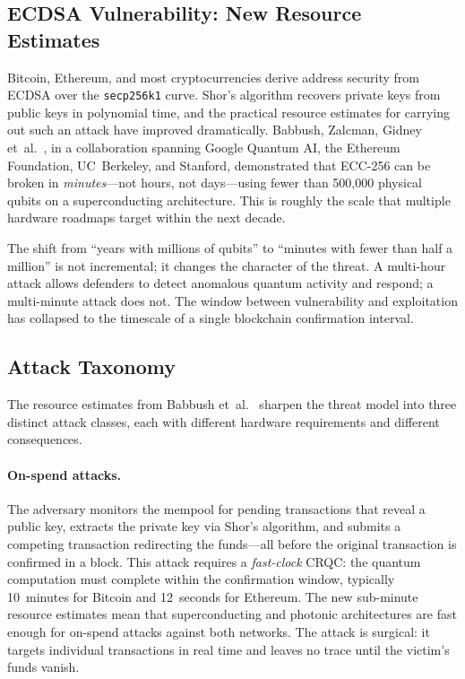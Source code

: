 \subsection{ECDSA Vulnerability: New Resource Estimates}
\label{subsec:ecdsa-vulnerability}

Bitcoin, Ethereum, and most cryptocurrencies derive address security from ECDSA over the \texttt{secp256k1} curve.  Shor's algorithm recovers private keys from public keys in polynomial time, and the practical resource estimates for carrying out such an attack have improved dramatically.  Babbush, Zalcman, Gidney et~al.~\cite{BabbushZalcmanGidney2026}, in a collaboration spanning Google Quantum AI, the Ethereum Foundation, UC~Berkeley, and Stanford, demonstrated that ECC-256 can be broken in \emph{minutes}---not hours, not days---using fewer than 500{,}000 physical qubits on a superconducting architecture.  This is roughly the scale that multiple hardware roadmaps target within the next decade.

The shift from ``years with millions of qubits'' to ``minutes with fewer than half a million'' is not incremental; it changes the character of the threat.  A multi-hour attack allows defenders to detect anomalous quantum activity and respond; a multi-minute attack does not.  The window between vulnerability and exploitation has collapsed to the timescale of a single blockchain confirmation interval.

\subsection{Attack Taxonomy}
\label{subsec:attack-taxonomy}

The resource estimates from Babbush et~al.~\cite{BabbushZalcmanGidney2026} sharpen the threat model into three distinct attack classes, each with different hardware requirements and different consequences.

\paragraph{On-spend attacks.}  The adversary monitors the mempool for pending transactions that reveal a public key, extracts the private key via Shor's algorithm, and submits a competing transaction redirecting the funds---all before the original transaction is confirmed in a block.  This attack requires a \emph{fast-clock} CRQC: the quantum computation must complete within the confirmation window, typically 10~minutes for Bitcoin and 12~seconds for Ethereum.  The new sub-minute resource estimates mean that superconducting and photonic architectures are fast enough for on-spend attacks against both networks.  The attack is surgical: it targets individual transactions in real time and leaves no trace until the victim's funds vanish.

